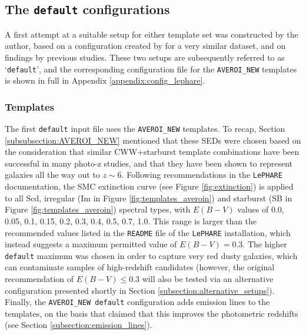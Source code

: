 \subsection{The \texttt{default} configurations}\label{subsection:default}
A first attempt at a suitable setup for either template set was constructed by the author, based on a configuration created by \cite{2013MNRAS.428.1281J} for a very similar dataset, and on findings by previous studies. These two setups are subsequently referred to as `\texttt{default}', and the corresponding configuration file for the \texttt{AVEROI\_NEW} templates is shown in full in Appendix \ref{appendix:config_lephare}. \par


\subsubsection{Templates}
The first \texttt{default} input file uses the \texttt{AVEROI\_NEW} templates. To recap, Section \ref{subsubsection:AVEROI_NEW} mentioned that these SEDs were chosen based on the consideration that similar CWW+starburst template combinations have been successful in  many photo-z studies, and that they have been shown to represent galaxies all the way out to $z\sim6$. Following recommendations in the \texttt{LePHARE} documentation, the SMC extinction curve (see Figure \ref{fig:extinction}) is applied to all Scd, irregular (Im in Figure \ref{fig:templates_averoin}) and starburst (SB in Figure \ref{fig:templates_averoin}) spectral types, with $E(B-V)$ values of 0.0, 0.05, 0.1, 0.15, 0.2, 0.3, 0.4, 0.5, 0.7, 1.0. This range is larger than the recommended values listed in the \texttt{README} file of the \texttt{LePHARE} installation, which instead suggests a maximum permitted value of $E(B-V)=0.3$. The higher \texttt{default} maximum was chosen in order to capture very red dusty galaxies, which can contaminate samples of high-redshift candidates (however, the original recommendation of $E(B-V)\leq0.3$ will also be tested via an alternative configuration presented shortly in Section \ref{subsection:alternative_setups}). Finally, the \texttt{AVEROI\_NEW default} configuration adds emission lines to the templates, on the basis that \cite{2009ApJ...690.1236I} claimed that this improves the photometric redshifts (see Section \ref{subsection:emission_lines}).\par

